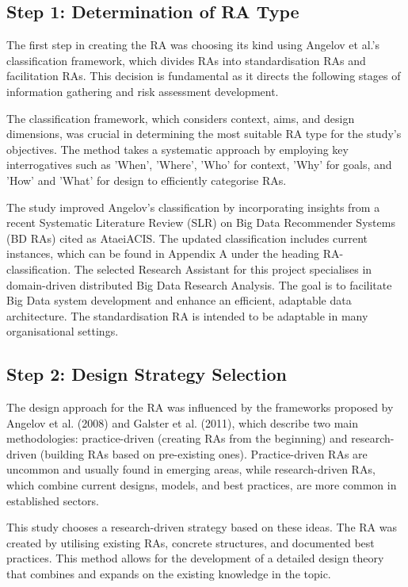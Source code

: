 \documentclass[preprint,12pt]{elsarticle}
\begin{document}
\subsection{Step 1: Determination of RA Type}

The first step in creating the RA was choosing its kind using Angelov et al.'s classification framework, which divides RAs into standardisation RAs and facilitation RAs. This decision is fundamental as it directs the following stages of information gathering and risk assessment development. 

The classification framework, which considers context, aims, and design dimensions, was crucial in determining the most suitable RA type for the study's objectives. The method takes a systematic approach by employing key interrogatives such as 'When', 'Where', 'Who' for context, 'Why' for goals, and 'How' and 'What' for design to efficiently categorise RAs.

The study improved Angelov's classification by incorporating insights from a recent Systematic Literature Review (SLR) on Big Data Recommender Systems (BD RAs) cited as AtaeiACIS. The updated classification includes current instances, which can be found in Appendix A under the heading RA-classification. The selected Research Assistant for this project specialises in domain-driven distributed Big Data Research Analysis. The goal is to facilitate Big Data system development and enhance an efficient, adaptable data architecture. The standardisation RA is intended to be adaptable in many organisational settings.


\subsection{Step 2: Design Strategy Selection}

The design approach for the RA was influenced by the frameworks proposed by Angelov et al. (2008) and Galster et al. (2011), which describe two main methodologies: practice-driven (creating RAs from the beginning) and research-driven (building RAs based on pre-existing ones). Practice-driven RAs are uncommon and usually found in emerging areas, while research-driven RAs, which combine current designs, models, and best practices, are more common in established sectors.

This study chooses a research-driven strategy based on these ideas. The RA was created by utilising existing RAs, concrete structures, and documented best practices. This method allows for the development of a detailed design theory that combines and expands on the existing knowledge in the topic.
\end{document}
